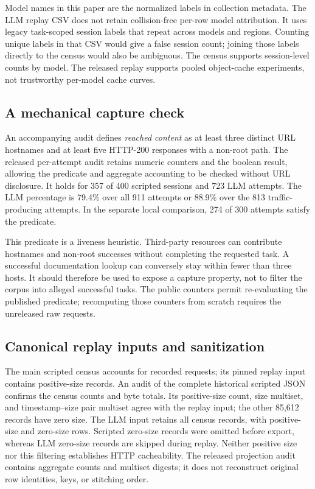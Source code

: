 \documentclass[10pt,sigconf,nonacm]{acmart}
\begin{document}
Model names in this paper are the normalized labels in collection metadata. The LLM replay CSV does not retain collision-free per-row model attribution. It uses legacy task-scoped session labels that repeat across models and regions. Counting unique labels in that CSV would give a false session count; joining those labels directly to the census would also be ambiguous. The census supports session-level counts by model. The released replay supports pooled object-cache experiments, not trustworthy per-model cache curves.

\subsection{A mechanical capture check}
An accompanying audit defines \emph{reached content} as at least three distinct URL hostnames and at least five HTTP-200 responses with a non-root path. The released per-attempt audit retains numeric counters and the boolean result, allowing the predicate and aggregate accounting to be checked without URL disclosure. It holds for 357 of 400 scripted sessions and 723 LLM attempts. The LLM percentage is 79.4\% over all 911 attempts or 88.9\% over the 813 traffic-producing attempts. In the separate local comparison, 274 of 300 attempts satisfy the predicate.

This predicate is a liveness heuristic. Third-party resources can contribute hostnames and non-root successes without completing the requested task. A successful documentation lookup can conversely stay within fewer than three hosts. It should therefore be used to expose a capture property, not to filter the corpus into alleged successful tasks. The public counters permit re-evaluating the published predicate; recomputing those counters from scratch requires the unreleased raw requests.

\subsection{Canonical replay inputs and sanitization}
The main scripted census accounts for \BTScriptedRecorded{} recorded requests; its pinned replay input contains \BTScriptedReplay{} positive-size records. An audit of the complete historical scripted JSON confirms the census counts and byte totals. Its positive-size count, size multiset, and timestamp--size pair multiset agree with the replay input; the other 85{,}612 records have zero size. The LLM input retains all \BTLLMRecorded{} census records, with \BTLLMReplay{} positive-size and \BTLLMZeroSize{} zero-size rows. Scripted zero-size records were omitted before export, whereas LLM zero-size records are skipped during replay. Neither positive size nor this filtering establishes HTTP cacheability. The released projection audit contains aggregate counts and multiset digests; it does not reconstruct original row identities, keys, or stitching order.
\end{document}
